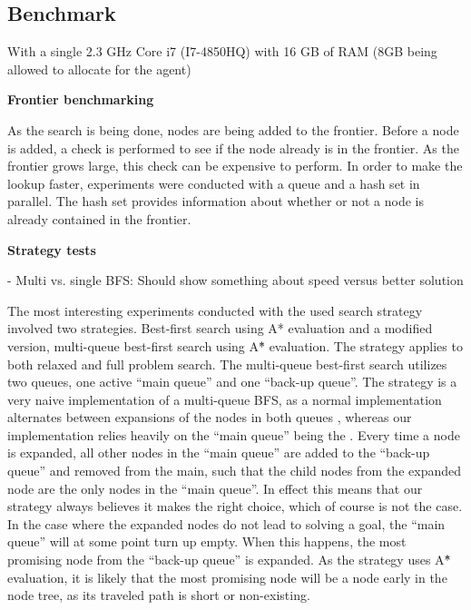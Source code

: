 \documentclass[Main]{subfiles}
\begin{document}
\subsection{Benchmark}

With a single 2.3 GHz Core i7 (I7-4850HQ) with 16 GB of RAM (8GB being allowed to allocate for the agent)



\textbf{Frontier benchmarking}

As the search is being done, nodes are being added to the frontier. Before a node is added, a check is performed to see if the node already is in the frontier. As the frontier grows large, this check can be expensive to perform. In order to make the lookup faster, experiments were conducted with a queue and a hash set in parallel. The hash set provides information about whether or not a node is already contained in the frontier.






\textbf{Strategy tests}

- Multi vs. single BFS: Should show something about speed versus better solution 



The most interesting experiments conducted with the used search strategy involved two strategies. Best-first search using A* evaluation and a modified version, multi-queue best-first search using A\^{*} evaluation. The strategy applies to both relaxed and full problem search. 
The multi-queue best-first search utilizes two queues, one active ``main queue'' and one ``back-up queue''. The strategy is a very naive implementation of a multi-queue BFS, as a normal implementation alternates between expansions of the nodes in both queues \cite{hector2013a}, whereas our implementation relies heavily on the ``main queue'' being the . Every time a node is expanded, all other nodes in the ``main queue'' are added to the ``back-up queue'' and removed from the main, such that the child nodes from the expanded node are the only nodes in the ``main queue''. In effect this means that our strategy always believes it makes the right choice, which of course is not the case. In the case where the expanded nodes do not lead to solving a goal, the ``main queue'' will at some point turn up empty. When this happens, the most promising node from the ``back-up queue'' is expanded. As the strategy uses A\^{*} evaluation, it is likely that the most promising node will be a node early in the node tree, as its traveled path is short or non-existing. 
\end{document}
